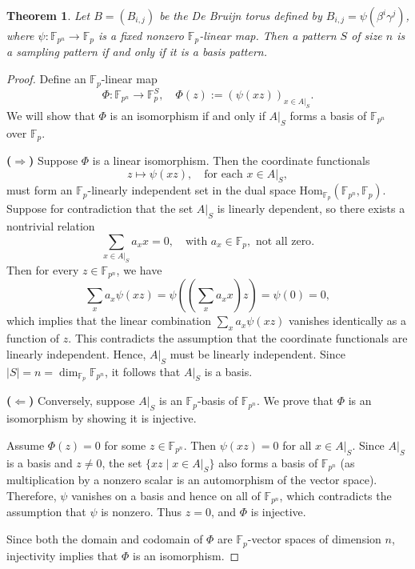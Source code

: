 \documentclass{article}
\newtheorem{theorem}{Theorem}[section]
\begin{document}
\begin{theorem}
Let \( B = (B_{i,j}) \) be the De Bruijn torus defined by \( B_{i,j} = \psi(\beta^i \gamma^j) \), where \( \psi: \mathbb{F}_{p^n} \to \mathbb{F}_p \) is a fixed nonzero \(\mathbb{F}_p\)-linear map. Then a pattern \( S\) of size $n$ is a sampling pattern if and only if  it is a basis pattern.
\end{theorem}
\begin{proof}
Define an \(\mathbb{F}_p\)-linear map
\[
\Phi: \mathbb{F}_{p^n} \to \mathbb{F}_p^{S}, \quad
\Phi(z) := \left( \psi(x z) \right)_{x \in A|_S}.
\]
We will show that \(\Phi\) is an isomorphism if and only if \( A|_S \) forms a basis of \( \mathbb{F}_{p^n} \) over \(\mathbb{F}_p\).

\textbf{(\(\Rightarrow\))} Suppose \(\Phi\) is a linear isomorphism. Then the coordinate functionals
\[
z \mapsto \psi(x z), \quad \text{for each } x \in A|_S,
\]
must form an \(\mathbb{F}_p\)-linearly independent set in the dual space \( \mathrm{Hom}_{\mathbb{F}_p}(\mathbb{F}_{p^n}, \mathbb{F}_p) \). Suppose for contradiction that the set \( A|_S \) is linearly dependent, so there exists a nontrivial relation
\[
\sum_{x \in A|_S} a_x x = 0, \quad \text{with } a_x \in \mathbb{F}_p, \text{ not all zero}.
\]
Then for every \( z \in \mathbb{F}_{p^n} \), we have
\[
\sum_{x} a_x \psi(x z) = \psi\left( \left( \sum_{x} a_x x \right) z \right) = \psi(0) = 0,
\]
which implies that the linear combination \( \sum_{x} a_x \psi(x z) \) vanishes identically as a function of \( z \). This contradicts the assumption that the coordinate functionals are linearly independent. Hence, \( A|_S \) must be linearly independent. Since \( |S| = n = \dim_{\mathbb{F}_p} \mathbb{F}_{p^n} \), it follows that \( A|_S \) is a basis.

\textbf{(\(\Leftarrow\))} Conversely, suppose \( A|_S \) is an \(\mathbb{F}_p\)-basis of \( \mathbb{F}_{p^n} \). We prove that \(\Phi\) is an isomorphism by showing it is injective.

Assume \( \Phi(z) = 0 \) for some \( z \in \mathbb{F}_{p^n} \). Then \( \psi(x z) = 0 \) for all \( x \in A|_S \). Since \( A|_S \) is a basis and \( z \ne 0 \), the set \( \{ x z \mid x \in A|_S \} \) also forms a basis of \( \mathbb{F}_{p^n} \) (as multiplication by a nonzero scalar is an automorphism of the vector space). Therefore, \( \psi \) vanishes on a basis and hence on all of \( \mathbb{F}_{p^n} \), which contradicts the assumption that \( \psi \) is nonzero. Thus \( z = 0 \), and \(\Phi\) is injective.

Since both the domain and codomain of \(\Phi\) are \( \mathbb{F}_p \)-vector spaces of dimension \( n \), injectivity implies that \(\Phi\) is an isomorphism.
\end{proof}
\end{document}
